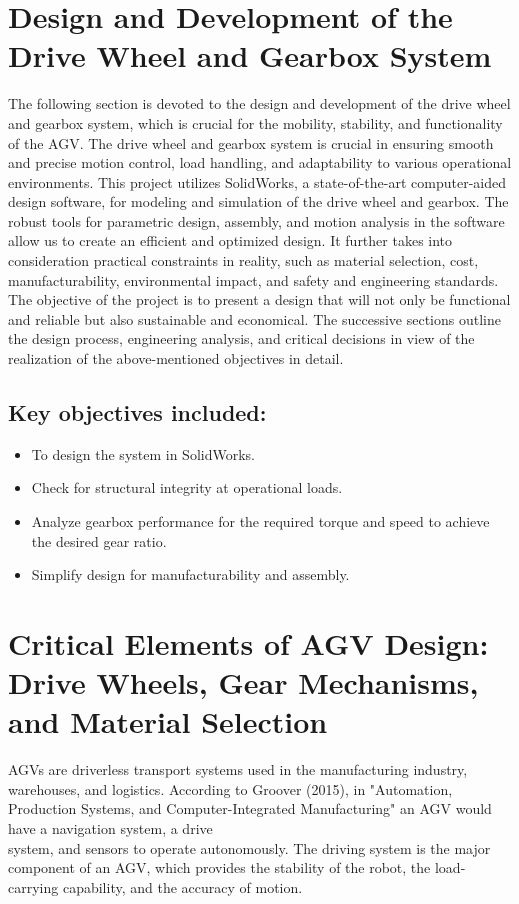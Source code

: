 \documentclass[../../main]{subfiles}
\begin{document}
\section{Design and Development of the Drive Wheel and Gearbox System}


The following section is devoted to the design and development of the drive wheel and gearbox system, which is crucial for the mobility, stability, and functionality of the AGV.
The drive wheel and gearbox system is crucial in ensuring smooth and precise motion control, load handling, and adaptability to various operational environments. This project utilizes SolidWorks, a state-of-the-art computer-aided design software, for modeling and simulation of the drive wheel and gearbox. The robust tools for parametric design, assembly, and motion analysis in the software allow us to create an efficient and optimized design. It further takes into consideration practical constraints in reality, such as material selection, cost, manufacturability, environmental impact, and safety and engineering standards.
The objective of the project is to present a design that will not only be functional and reliable but also sustainable and economical. The successive sections outline the design process, engineering analysis, and critical decisions in view of the realization of the above-mentioned objectives in detail.

\subsection*{Key objectives included:}

\begin{itemize}
\item
  To design the system in SolidWorks.
\item
  Check for structural integrity at operational loads.
\item
  Analyze gearbox performance for the required torque and speed to
  achieve the desired gear ratio.
\item
  Simplify design for manufacturability and assembly.
\end{itemize}
\newpage
\section{Critical Elements of AGV Design: Drive Wheels, Gear Mechanisms, and Material Selection}

AGVs are driverless transport systems used in the manufacturing
industry, warehouses, and logistics. According to Groover (2015)\cite{groover2016automation}, in
"Automation, Production Systems, and Computer-Integrated Manufacturing"
an AGV would have a navigation system, a drive \\system, and sensors to
operate autonomously. The driving system is the major component of an
AGV, which provides the stability of the robot, the load-carrying
capability, and the accuracy of motion.
\end{document}
